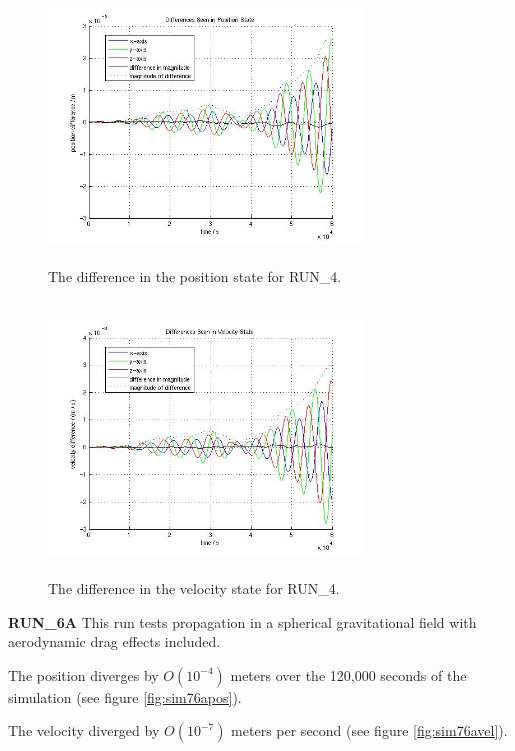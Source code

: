 \begin{description}
\begin{figure}[htp]
\begin{center}
\includegraphics[width=3.2736in,height=2.85in]{figures/run4pos.jpg}
\caption{The difference in the position state for RUN\_4.}
\label{fig:sim74pos}
\end{center}
\end{figure}

\begin{figure}[htp]
\begin{center}
\includegraphics[width=3.2736in,height=2.85in]{figures/run4vel.jpg}
\caption{The difference in the velocity state for RUN\_4.}
\label{fig:sim74vel}
\end{center}
\end{figure}


\clearpage
{\bf RUN\_6A}
This run tests propagation in a spherical gravitational field with aerodynamic 
drag effects included.

The position diverges by $O(10^{-4})$ meters over the 120,000 seconds of the 
simulation (see figure \ref{fig:sim76apos}).

The velocity diverged by $O(10^{-7})$ meters per second (see figure 
\ref{fig:sim76avel}).


\end{description}

